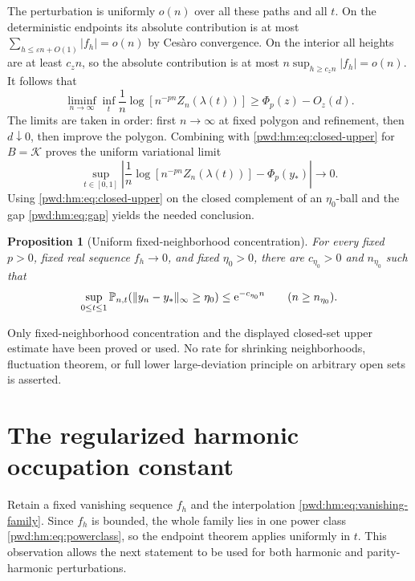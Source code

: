\documentclass[11pt,letterpaper]{article}
\numberwithin{equation}{section}
\newtheorem{proposition}[theorem]{Proposition}
\theoremstyle{remark}\newtheorem{remark}[theorem]{Remark}
\newcommand{\K}{\mathcal K}\newcommand{\ee}{\mathrm e}\newcommand{\dd}{\,\mathrm d}
\begin{document}
The perturbation is uniformly $o(n)$ over all these paths and all $t$. On the deterministic endpoints its absolute contribution is at most
$\sum_{h\le\varepsilon n+O(1)}|f_h|=o(n)$ by Ces\`aro convergence. On the interior all heights are at least $c_zn$, so the absolute contribution is at most
$n\sup_{h\ge c_zn}|f_h|=o(n)$. It follows that
\[
 \liminf_{n\to\infty}\inf_t\frac1n\log[n^{-pn}Z_n(\lambda(t))]
 \ge\Phi_p(z)-O_z(d).
\]
The limits are taken in order: first $n\to\infty$ at fixed polygon and refinement, then $d\downarrow0$, then improve the polygon. Combining with \eqref{pwd:hm:eq:closed-upper} for $B=\K$ proves the uniform variational limit
\begin{equation}\label{pwd:hm:eq:free-energy}
 \sup_{t\in[0,1]}\left|\frac1n\log[n^{-pn}Z_n(\lambda(t))]-\Phi_p(y_*)\right|
 \longrightarrow0.
\end{equation}
Using \eqref{pwd:hm:eq:closed-upper} on the closed complement of an $\eta_0$-ball and the gap \eqref{pwd:hm:eq:gap} yields the needed conclusion.

\begin{proposition}[Uniform fixed-neighborhood concentration]\label{pwd:hm:prop:concentration}
For every fixed $p>0$, fixed real sequence $f_h\to0$, and fixed $\eta_0>0$, there are $c_{\eta_0}>0$ and $n_{\eta_0}$ such that
\begin{equation}\label{pwd:hm:eq:concentration}
 \sup_{0\le t\le1}\Prob_{n,t}(\|y_n-y_*\|_\infty\ge\eta_0)
 \le\ee^{-c_{\eta_0}n}\qquad(n\ge n_{\eta_0}).
\end{equation}
\end{proposition}
Only fixed-neighborhood concentration and the displayed closed-set upper estimate have been proved or used. No rate for shrinking neighborhoods, fluctuation theorem, or full lower large-deviation principle on arbitrary open sets is asserted.

\section{The regularized harmonic occupation constant}\label{pwd:hm:sec:harmonic-occupation}
Retain a fixed vanishing sequence $f_h$ and the interpolation \eqref{pwd:hm:eq:vanishing-family}. Since $f_h$ is bounded, the whole family lies in one power class \eqref{pwd:hm:eq:powerclass}, so the endpoint theorem applies uniformly in $t$. This observation allows the next statement to be used for both harmonic and parity-harmonic perturbations.
\end{document}
